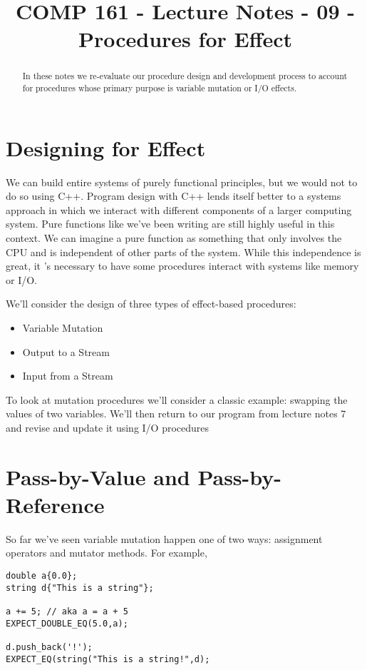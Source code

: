 \documentclass[nobib]{tufte-handout}
\title{COMP 161 - Lecture Notes - 09 - Procedures for Effect}
\begin{document}
 
\maketitle

\begin{abstract}
In these notes we re-evaluate our procedure design and development process to account for procedures whose primary purpose is variable mutation or I/O effects.
\end{abstract}

\section{ Designing for Effect }

We can build entire systems of purely functional principles, but we would not to do so using C++.  Program design with C++ lends itself better to a systems approach in which we interact with different components of a larger computing system.  Pure functions like we've been writing are still highly useful in this context. We can imagine a pure function as something that only involves the CPU and is independent of other parts of the system.  While this independence is great, it 's necessary to have some procedures interact with systems like memory or I/O.

We'll consider the design of three types of effect-based procedures:
\begin{itemize}
\item Variable Mutation
\item Output to a Stream
\item Input from a Stream
\end{itemize}    
To look at mutation procedures we'll consider a classic example: swapping the values of two variables. We'll then return to our program from lecture notes 7 and revise and update it using I/O procedures

\section{ Pass-by-Value and Pass-by-Reference }

So far we've seen variable mutation happen one of two ways: assignment operators and mutator methods. For example,
\begin{verbatim}
double a{0.0};
string d{"This is a string"};

a += 5; // aka a = a + 5
EXPECT_DOUBLE_EQ(5.0,a);

d.push_back('!');
EXPECT_EQ(string("This is a string!",d);
\end{verbatim}
\end{document}
